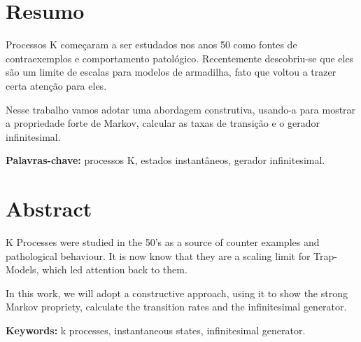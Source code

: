 

\chapter*{Resumo}

Processos K começaram a ser estudados nos anos 50 como fontes de
contraexemplos e comportamento patológico. Recentemente
descobriu-se que eles são um limite de escalas para modelos de
armadilha, fato que voltou a trazer certa atenção para eles.

Nesse trabalho vamos adotar uma abordagem construtiva, usando-a para
mostrar a propriedade forte de Markov, calcular as taxas de transição
e o gerador infinitesimal.

\noindent \textbf{Palavras-chave:} processos K, estados instantâneos,
gerador infinitesimal.

\chapter*{Abstract}

K Processes were studied in the 50's as a source of counter examples
and pathological behaviour. It is now know that they are a scaling
limit for Trap-Models, which led attention back to them.

In this work, we will adopt a constructive approach, using it to show
the strong Markov propriety, calculate the transition rates and
the infinitesimal generator.

\noindent \textbf{Keywords:} k processes, instantaneous states,
infinitesimal generator.



